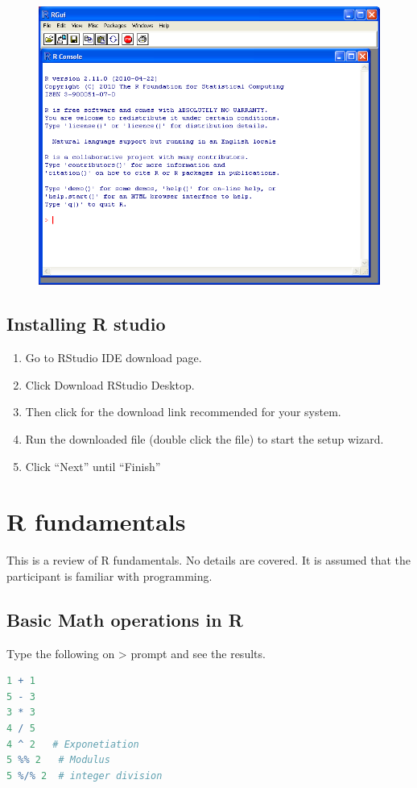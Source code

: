 \documentclass["../Applied_probabillity _and_statistics_lab_KTU.tex"]{subfiles}
\begin{document}
  \begin{figure}
 \includegraphics[scale=.4]{chapters/images/console.png}
 \label{console_windows}
 \end{figure} 
  
  
  
\subsection{Installing R studio}
\begin{enumerate}
 \item    Go to RStudio IDE download page.
   \item   Click Download RStudio Desktop.
  \item    Then click for the download link recommended for your system.
  \item    Run the downloaded file (double click the file) to start the setup wizard.
  \item    Click “Next” until “Finish”
\end{enumerate}
     
 \section{R fundamentals}
 
This is a review of R fundamentals. No details are covered. It is assumed that the participant is familiar with programming.
\subsection{Basic Math operations in R}
Type the following  on > prompt and see the results. 
 \begin{lstlisting}[language=R]
1 + 1
5 - 3
3 * 3
4 / 5
4 ^ 2   # Exponetiation
5 %% 2   # Modulus
5 %/% 2  # integer division


\end{lstlisting}
\end{document}
